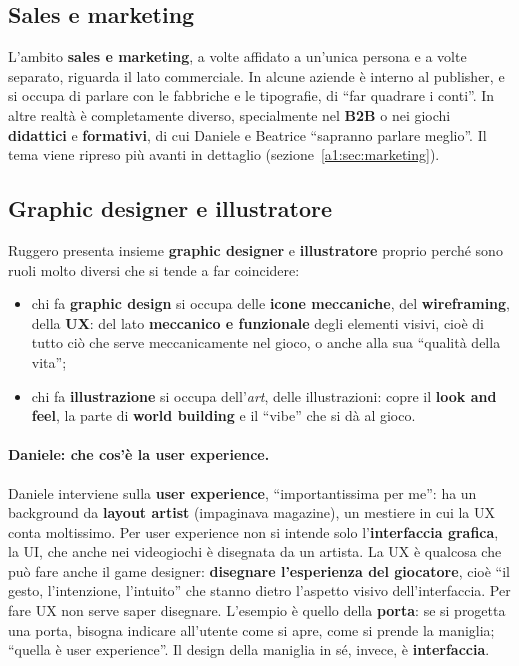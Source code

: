 \subsection{Sales e marketing}

L'ambito \textbf{sales e marketing}, a volte affidato a un'unica persona e a
volte separato, riguarda il lato commerciale. In alcune aziende è interno al
publisher, e si occupa di parlare con le fabbriche e le tipografie, di ``far
quadrare i conti''. In altre realtà è completamente diverso, specialmente nel
\textbf{B2B} o nei giochi \textbf{didattici} e \textbf{formativi}, di cui
Daniele e Beatrice ``sapranno parlare meglio''. Il tema viene ripreso più avanti
in dettaglio (sezione~\ref{a1:sec:marketing}).

\subsection{Graphic designer e illustratore}

Ruggero presenta insieme \textbf{graphic designer} e \textbf{illustratore}
proprio perché sono ruoli molto diversi che si tende a far coincidere:
\begin{itemize}
  \item chi fa \textbf{graphic design} si occupa delle \textbf{icone meccaniche},
        del \textbf{wireframing}, della \textbf{UX}: del lato \textbf{meccanico e
        funzionale} degli elementi visivi, cioè di tutto ciò che serve
        meccanicamente nel gioco, o anche alla sua ``qualità della vita'';
  \item chi fa \textbf{illustrazione} si occupa dell'\emph{art}, delle
        illustrazioni: copre il \textbf{look and feel}, la parte di
        \textbf{world building} e il ``vibe'' che si dà al gioco.
\end{itemize}

\paragraph{Daniele: che cos'è la user experience.} Daniele interviene sulla
\textbf{user experience}, ``importantissima per me'': ha un background da
\textbf{layout artist} (impaginava magazine), un mestiere in cui la UX conta
moltissimo. Per user experience non si intende solo l'\textbf{interfaccia
grafica}, la UI, che anche nei videogiochi è disegnata da un artista. La UX è
qualcosa che può fare anche il game designer: \textbf{disegnare l'esperienza del
giocatore}, cioè ``il gesto, l'intenzione, l'intuito'' che stanno dietro
l'aspetto visivo dell'interfaccia. Per fare UX non serve saper disegnare.
L'esempio è quello della \textbf{porta}: se si progetta una porta, bisogna
indicare all'utente come si apre, come si prende la maniglia; ``quella è user
experience''. Il design della maniglia in sé, invece, è
\textbf{interfaccia}.

